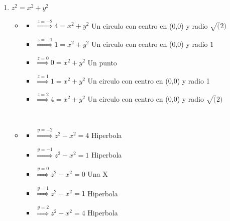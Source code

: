 \documentclass[../practica_02.tex]{subfiles}
\begin{document}
\begin{enumerate}
\begin{enumerate}
                \item $z^2 = x^2 + y^2$

                    \begin{itemize}
                        \item
                            \begin{itemize}
                                \item $\stackrel{z=-2}{\Rightarrow}  4 = x^2 + y^2 $ Un circulo con centro en (0,0) y radio $\sqrt(2)$
                                \item $\stackrel{z=-1}{\Rightarrow}  1 = x^2 + y^2 $ Un circulo con centro en (0,0) y radio 1
                                \item $\stackrel{z=0}{\Rightarrow}   0 = x^2 + y^2 $ Un punto
                                \item $\stackrel{z=1}{\Rightarrow}   1 = x^2 + y^2 $ Un circulo con centro en (0,0) y radio 1
                                \item $\stackrel{z=2}{\Rightarrow}   4 = x^2 + y^2 $ Un circulo con centro en (0,0) y radio $\sqrt(2)$
                            \end{itemize}

                            $ $

                        \item
                            \begin{itemize}
                                \item $\stackrel{y=-2}{\Rightarrow} z^2 - x^2 = 4 $ Hiperbola
                                \item $\stackrel{y=-1}{\Rightarrow} z^2 - x^2 = 1 $ Hiperbola
                                \item $\stackrel{y=0}{\Rightarrow}  z^2 - x^2 = 0 $ Una X
                                \item $\stackrel{y=1}{\Rightarrow}  z^2 - x^2 = 1 $ Hiperbola
                                \item $\stackrel{y=2}{\Rightarrow}  z^2 - x^2 = 4 $ Hiperbola
                            \end{itemize}

                            $ $


\end{itemize}
\end{enumerate}
\end{enumerate}
\end{document}
